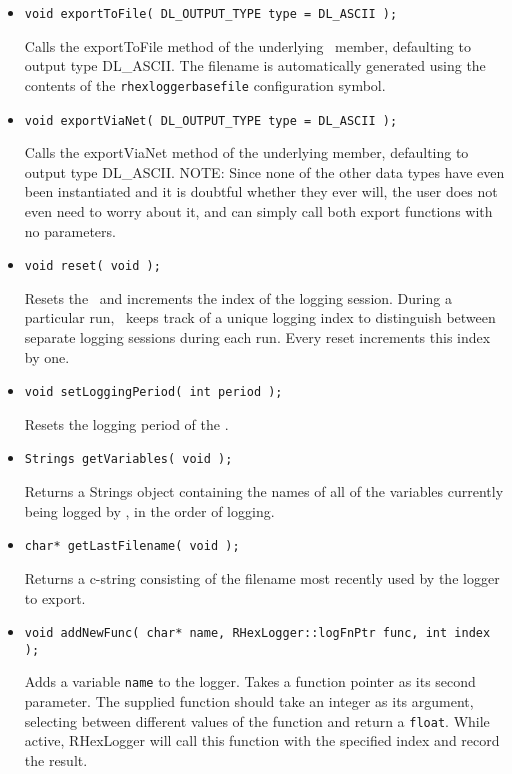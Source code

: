 \begin{itemize}
\item{\tt void exportToFile( DL\_OUTPUT\_TYPE type = DL\_ASCII ); }\par
Calls the exportToFile method of the underlying \DataLogger\ member,
defaulting to output type DL\_ASCII. The filename is automatically generated
using the contents of the {\tt rhexloggerbasefile} configuration symbol.

\item{\tt void exportViaNet( DL\_OUTPUT\_TYPE type = DL\_ASCII ); }\par
Calls the exportViaNet method of the underlying \DataLogger member,
defaulting to output type DL\_ASCII. NOTE: Since none of the other data 
types have even been instantiated and it is doubtful whether they ever 
will, the user does not even need to worry about it, and can simply
call both export functions with no parameters.

\item{\tt void reset( void ); }\par
Resets the \DataLogger\ and increments the index of the logging
session. During a particular run, \RHexLogger\ keeps track of a unique
logging index to distinguish between separate logging sessions during each
run. Every reset increments this index by one.

\item{\tt void setLoggingPeriod( int period ); }\par
Resets the logging period of the \DataLogger.

\item{\tt Strings getVariables( void ); }\par
Returns a Strings object containing the names of all of the variables
currently being logged by \RHexLogger, in the order of logging.

\item{\tt char* getLastFilename( void ); }\par
Returns a c-string consisting of the filename most recently used by
the logger to export.

\item{\tt void addNewFunc( char* name, RHexLogger::logFnPtr func, int index );}\par

Adds a variable {\tt name} to the logger. Takes a function pointer as its
second parameter. The supplied function should take an integer as its
argument, selecting between different values of the function and return a
{\tt float}. While active, RHexLogger will call this function with the
specified index and record the result.


\end{itemize}

